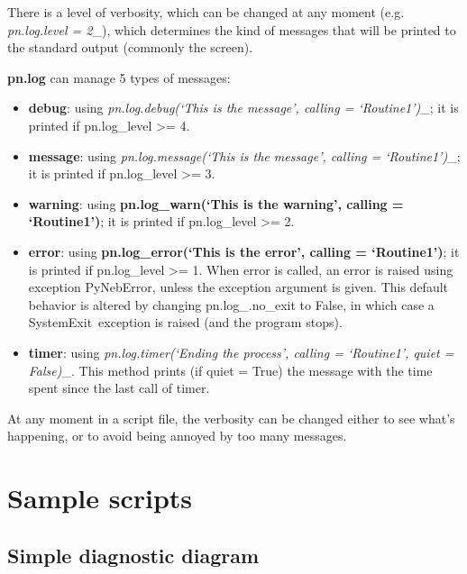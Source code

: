 \documentclass{report}
\begin{document}
There is a level of verbosity, which can be changed at any moment (e.g.
\emph{\emph{pn.log}.level = 2}\_), which determines the kind of messages
that will be printed to the standard output (commonly the screen).

\textbf{pn.log} can manage 5 types of messages:

    \begin{itemize}
\item
  \textbf{debug}: using \emph{\emph{pn.log}.debug(`This is the message',
  calling = `Routine1')}\_; it is printed if pn.log\_level
  \textgreater{}= 4.
\item
  \textbf{message}: using \emph{\emph{pn.log}.message(`This is the
  message', calling = `Routine1')}\_; it is printed if pn.log\_level
  \textgreater{}= 3.
\item
  \textbf{warning}: using \textbf{pn.log\_warn(`This is the warning',
  calling = `Routine1')}; it is printed if pn.log\_level \textgreater{}=
  2.
\item
  \textbf{error}: using \textbf{pn.log\_error(`This is the error',
  calling = `Routine1')}; it is printed if pn.log\_level \textgreater{}=
  1. When error is called, an error is raised using exception
  PyNebError, unless the exception argument is given. This default
  behavior is altered by changing pn.log\_.no\_exit to False, in which
  case a SystemExit~exception is raised (and the program stops).
\item
  \textbf{timer}: using \emph{\emph{pn.log}.timer(`Ending the process',
  calling = `Routine1', quiet = False)}\_. This method prints (if quiet
  = True) the message with the time spent since the last call of timer.
\end{itemize}

    At any moment in a script file, the verbosity can be changed either to
see what's happening, or to avoid being annoyed by too many messages.


    \chapter{Sample scripts}



    \section{Simple diagnostic diagram}
\end{document}
